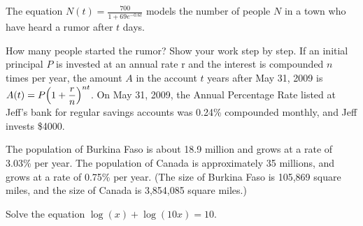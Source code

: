 \documentclass[11pt,answers]{exam}
\renewcommand{\baselinestretch}{1.50}\normalsize
\let\originalleft\left
\let\originalright\right
\renewcommand{\left}{\mathopen{}\mathclose\bgroup\originalleft}
\renewcommand{\right}{\aftergroup\egroup\originalright}
\begin{document}
\begin{questions}


\addpoints

\question[2] The equation 
$\displaystyle N(t) = \frac{700}{1 + 69e^{−0.6t}}$
models the number of people $N$ in a town who have heard a rumor after $t$ days. 

How many people started the rumor? Show your work step by step.
\fillwithdottedlines{2cm}
\question If an initial principal $P$ is invested at an annual rate r and the interest is compounded $n$ times per year, the amount $A$ 
in the account $t$ years after May 31, 2009 is
$\displaystyle A(t) = P\left(1 + \frac{r}{n}\right )^{nt}$.
On May 31, 2009, the Annual Percentage Rate listed at Jeff's bank for regular savings accounts was 0.24\% compounded monthly, and Jeff invests \$4000.

\question The population of Burkina Faso is about 18.9 million and grows at a rate of 3.03\% per year. The population of Canada is approximately 35 millions, and grows at a rate of 0.75\% per year. (The size of Burkina Faso is 105,869 square  miles, and the size of Canada is 3,854,085 square miles.) 
\question[2] Solve the equation $\displaystyle \log(x)+\log(10x)=10$.
\fillwithdottedlines{3cm}

\end{questions}
\end{document}
